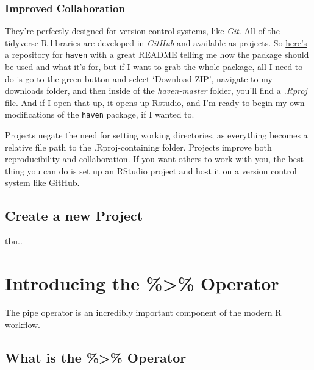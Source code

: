 \documentclass[
]{article}
\begin{document}
\hypertarget{improved-collaboration}{%
\subsubsection{Improved Collaboration}\label{improved-collaboration}}

They're perfectly designed for version control systems, like \emph{Git}. All of the tidyverse R libraries are developed in \emph{GitHub} and available as projects. So \href{https://github.com/tidyverse/haven}{here's} a repository for \texttt{haven} with a great README telling me how the package should be used and what it's for, but if I want to grab the whole package, all I need to do is go to the green button and select `Download ZIP', navigate to my downloads folder, and then inside of the \emph{haven-master} folder, you'll find a \emph{.Rproj} file. And if I open that up, it opens up Rstudio, and I'm ready to begin my own modifications of the \texttt{haven} package, if I wanted to.

Projects negate the need for setting working directories, as everything becomes a relative file path to the .Rproj-containing folder. Projects improve both reproducibility and collaboration. If you want others to work with you, the best thing you can do is set up an RStudio project and host it on a version control system like GitHub.

\hypertarget{create-a-new-project}{%
\subsection{Create a new Project}\label{create-a-new-project}}

tbu..

\hypertarget{introducing-the-operator}{%
\section{Introducing the \%\textgreater\% Operator}\label{introducing-the-operator}}

The pipe operator is an incredibly important component of the modern R workflow.

\hypertarget{what-is-the-operator}{%
\subsection{What is the \%\textgreater\% Operator}\label{what-is-the-operator}}
\end{document}
